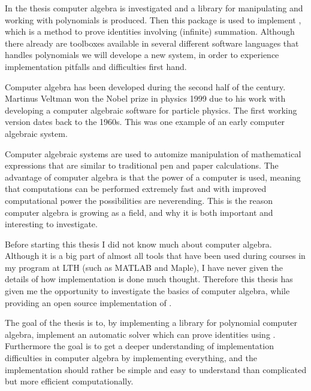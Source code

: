 In the thesis computer algebra is investigated and a library for manipulating and working with polynomials is produced. Then this package is used to implement \WZ, which is a method to prove identities involving (infinite) summation. Although there already are toolboxes available in several different software languages that handles polynomials we will develope a new system, in order to experience implementation pitfalls and difficulties first hand.

Computer algebra has been developed during the second half of the  century. Martinus Veltman won the Nobel prize in physics 1999 due to his work with developing a computer algebraic software for particle physics. The first working version dates back to the 1960s.  This was one example of an early computer algebraic system.

Computer algebraic systems are used to automize manipulation of mathematical expressions that are similar to traditional pen and paper calculations. The advantage of computer algebra is that the power of a computer is used, meaning that computations can be performed extremely fast and with improved computational power the possibilities are neverending. This is the reason computer algebra is growing as a field, and why it is both important and interesting to investigate.

Before starting this thesis I did not know much about computer algebra. Although it is a big part of almost all tools that have been used during courses in my program at LTH (such as MATLAB and Maple), I have never given the details of how implementation is done much thought. Therefore this thesis has given me the opportunity to investigate the basics of computer algebra, while providing an open source implementation of \WZ.

The goal of the thesis is to, by implementing a library for polynomial computer algebra, implement an automatic solver which can prove identities using \WZ. Furthermore the goal is to get a deeper understanding of implementation difficulties in computer algebra by implementing everything, and the implementation should rather be simple and easy to understand than complicated but more efficient computationally.


